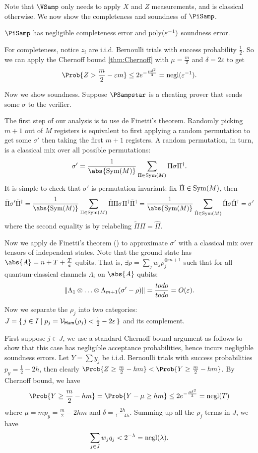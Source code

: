 Note that $\VSamp$ only needs to apply $X$ and $Z$ measurements, and is classical otherwise. We now show the completeness and soundness of $\PiSamp$.

\begin{thm}
    \label{QPIP1thm}
	$\PiSamp$ has negligible completeness error and $\operatorname*{\operatorname{poly}}(\varepsilon^{-1})$ soundness error.
\end{thm}
\begin{prf}
	For completeness, notice $z_i$ are i.i.d. Bernoulli trials with success probability $\frac{1}{2}$.
	So we can apply the Chernoff bound \cref{thm:Chernoff} with $\mu=\frac{m}{2}$ and $\delta=2\varepsilon$ to get
	$$\Prob{Z>\frac{m}{2}-\varepsilon m}\leq2e^{-\frac{\mu\delta^2}{3}}=\negl(\varepsilon^{-1}).$$

	Now we show soundness.
	Suppose $\PSampstar$ is a cheating prover that sends some $\sigma$ to the verifier.

	The first step of our analysis is to use de Finetti's theorem.
	Randomly picking $m+1$ out of $M$ registers is equivalent to first applying a random permutation to get some $\sigma'$ then taking the first $m+1$ registers.
	A random permutation, in turn, is a classical mix over all possible permutations:
	$$\sigma'=\frac{1}{\abs{\Sym(M)}}\sum_{\Pi\in\Sym(M)}\Pi\sigma\Pi^\dagger.$$
	It is simple to check that $\sigma'$ is permutation-invariant:
	fix $\tilde{\Pi}\in\operatorname{Sym}(M)$, then
	$$\tilde{\Pi}\sigma'\tilde{\Pi}^\dagger
	=\frac{1}{\abs{\Sym(M)}}\sum_{\Pi\in\Sym(M)}\tilde{\Pi}\Pi\sigma\Pi^\dagger\tilde{\Pi}^\dagger
	=\frac{1}{\abs{\Sym(M)}}\sum_{\hat{\Pi}\in\Sym(M)}\hat{\Pi}\sigma\hat{\Pi}^\dagger
	=\sigma'$$
	where the second equality is by relabeling $\tilde{\Pi}\Pi=\hat{\Pi}$.

	Now we apply de Finetti's theorem () to approximate $\sigma'$ with a classical mix over tensors of independent states.
	Note that the ground state has $\abs{A}=n+T+\frac{T}{e}$ qubits.
	That is, $\exists\rho=\sum_j w_j\rho_j^{\otimes m+1}$ such that for all quantum-classical channels $\Lambda_i$ on $\abs{A}$ qubits:
	$$\left\lVert\Lambda_1\otimes\ldots\otimes\Lambda_{m+1}(\sigma'-\rho)\right\rVert=\frac{todo}{todo}=O(\varepsilon).$$

	Now we separate the $\rho_j$ into two categories: $J=\set{j\in I|p_j=\mathcal{V}_{\mathsf{Ham}}(\rho_j)<\frac{1}{2}-2\varepsilon}$ and its complement.

	First suppose $j\in J$, we use a standard Chernoff bound argument as follows to show that this case has negligible acceptance probabilities,
	hence incurs negligible soundness errors.
	Let $Y=\sum y_j$ be i.i.d. Bernoulli trials with success probabilities $p_y=\frac{1}{2}-2h$,
	then clearly $\Prob{Z\geq\frac{m}{2}-hm}<\Prob{Y\geq\frac{m}{2}-hm}$.
	By Chernoff bound, we have
	$$\Prob{Y\geq\frac{m}{2}-hm}=\Prob{Y-\mu\geq hm}\leq2e^{-\frac{\mu\delta^2}{3}}=\negl(T)$$
	where $\mu=mp_y=\frac{m}{2}-2hm$ and $\delta=\frac{2h}{1-4h}$.
	Summing up all the $\rho_j$ terms in $J$, we have
	$$\sum_{j\in J} w_j q_j<2^{-\lambda}=\operatorname{negl}(\lambda).$$


\end{prf}
